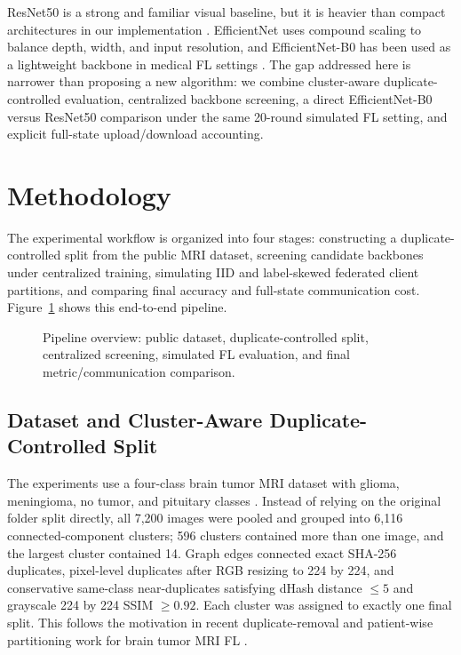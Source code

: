 \documentclass[conference]{IEEEtran}
\begin{document}
ResNet50 is a strong and familiar visual baseline, but it is heavier than compact architectures in our implementation \cite{he2016resnet,bentemessek2025brain,khatoon2026resnet50}. EfficientNet uses compound scaling to balance depth, width, and input resolution, and EfficientNet-B0 has been used as a lightweight backbone in medical FL settings \cite{tan2019efficientnet,abubakr2026explainable}. The gap addressed here is narrower than proposing a new algorithm: we combine cluster-aware duplicate-controlled evaluation, centralized backbone screening, a direct EfficientNet-B0 versus ResNet50 comparison under the same 20-round simulated FL setting, and explicit full-state upload/download accounting.

\section{Methodology}
The experimental workflow is organized into four stages: constructing a duplicate-controlled split from the public MRI dataset, screening candidate backbones under centralized training, simulating IID and label-skewed federated client partitions, and comparing final accuracy and full-state communication cost. Figure~\ref{fig:pipeline} shows this end-to-end pipeline.

\begin{figure}[t]
\centering
\resizebox{\textwidth}{!}{}
\caption{Pipeline overview: public dataset, duplicate-controlled split, centralized screening, simulated FL evaluation, and final metric/communication comparison.}
\label{fig:pipeline}
\end{figure}

\subsection{Dataset and Cluster-Aware Duplicate-Controlled Split}
The experiments use a four-class brain tumor MRI dataset with glioma, meningioma, no tumor, and pituitary classes \cite{nickparvar_brain_tumor_mri}. Instead of relying on the original folder split directly, all 7,200 images were pooled and grouped into 6,116 connected-component clusters; 596 clusters contained more than one image, and the largest cluster contained 14. Graph edges connected exact SHA-256 duplicates, pixel-level duplicates after RGB resizing to 224 by 224, and conservative same-class near-duplicates satisfying dHash distance $\leq 5$ and grayscale 224 by 224 SSIM $\geq 0.92$. Each cluster was assigned to exactly one final split. This follows the motivation in recent duplicate-removal and patient-wise partitioning work for brain tumor MRI FL \cite{melo2026exploiting,siam2026brain}.
\end{document}
